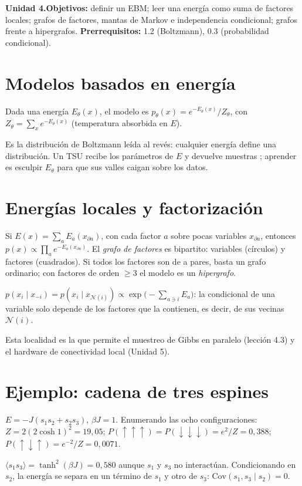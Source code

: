 \documentclass[11pt,a4paper]{article}
\begin{document}

\noindent\textbf{Unidad 4.}\quad\textbf{Objetivos:} definir un EBM; leer una energía como suma de factores locales; grafos de factores,
mantas de Markov e independencia condicional; grafos frente a hipergrafos.
\textbf{Prerrequisitos:} 1.2 (Boltzmann), 0.3 (probabilidad condicional).

\section{Modelos basados en energía}
\begin{definicion}[ (EBM)]
Dada una energía $E_\theta(x)$, el modelo es $p_\theta(x)=e^{-E_\theta(x)}/Z_\theta$, con $Z_\theta=\sum_xe^{-E_\theta(x)}$ (temperatura absorbida en $E$).
\end{definicion}
Es la distribución de Boltzmann leída al revés: cualquier energía define una distribución. Un TSU recibe los parámetros de $E$ y devuelve
muestras \cite{extropic}; aprender es esculpir $E_\theta$ para que sus valles caigan sobre los datos.

\section{Energías locales y factorización}
Si $E(x)=\sum_aE_a(x_{\partial a})$, con cada factor $a$ sobre pocas variables $x_{\partial a}$, entonces $p(x)\propto\prod_ae^{-E_a(x_{\partial a})}$.
El \emph{grafo de factores} es bipartito: variables (círculos) y factores (cuadrados). Si todos los factores son de a pares, basta un grafo
ordinario; con factores de orden $\ge3$ el modelo es un \emph{hipergrafo}.
\begin{resultado}
$p(x_i\mid x_{-i})=p(x_i\mid x_{\mathcal N(i)})\propto\exp\big(-\sum_{a\ni i}E_a\big)$: la condicional de una variable solo depende de los factores que la
contienen, es decir, de sus vecinas $\mathcal N(i)$.
\end{resultado}
Esta localidad es la que permite el muestreo de Gibbs en paralelo (lección 4.3) y el hardware de conectividad local (Unidad 5).

\section{Ejemplo: cadena de tres espines}
$E=-J(s_1s_2+s_2s_3)$, $\beta J=1$. Enumerando las ocho configuraciones: $Z=2(2\cosh1)^2=19{,}05$;
$P(\uparrow\uparrow\uparrow)=P(\downarrow\downarrow\downarrow)=e^2/Z=0{,}388$; $P(\uparrow\downarrow\uparrow)=e^{-2}/Z=0{,}0071$.
\begin{ejemplo}
$\langle s_1s_3\rangle=\tanh^2(\beta J)=0{,}580$ aunque $s_1$ y $s_3$ no interactúan. Condicionando en $s_2$, la energía se separa en un término
de $s_1$ y otro de $s_3$: $\mathrm{Cov}(s_1,s_3\mid s_2)=0$.
\end{ejemplo}
\end{document}
